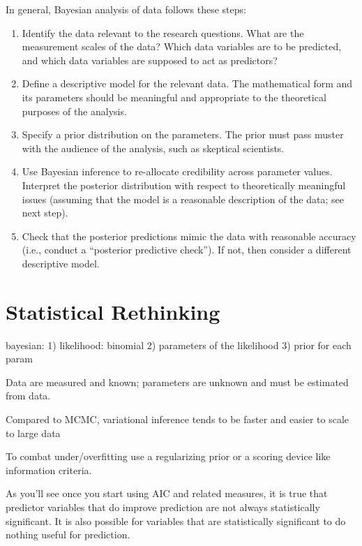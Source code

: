 \documentclass[]{book}
\begin{document}
In general, Bayesian analysis of data follows these steps:

\begin{enumerate}
\def\labelenumi{\arabic{enumi}.}
\item
  Identify the data relevant to the research questions. What are the measurement scales of the data? Which data variables are to be predicted, and which data variables are supposed to act as predictors?
\item
  Define a descriptive model for the relevant data. The mathematical form and its parameters should be meaningful and appropriate to the theoretical purposes of the analysis.
\item
  Specify a prior distribution on the parameters. The prior must pass muster with the audience of the analysis, such as skeptical scientists.
\item
  Use Bayesian inference to re-allocate credibility across parameter values. Interpret the posterior distribution with respect to theoretically meaningful issues (assuming that the model is a reasonable description of the data; see next step).
\item
  Check that the posterior predictions mimic the data with reasonable accuracy (i.e., conduct a ``posterior predictive check''). If not, then consider a different descriptive model.
\end{enumerate}

\hypertarget{statistical-rethinking}{%
\section{Statistical Rethinking}\label{statistical-rethinking}}

bayesian: 1) likelihood: binomial 2) parameters of the likelihood 3) prior for each param

Data are measured and known; parameters are unknown and must be estimated from data.

Compared to MCMC, variational inference tends to be faster and easier to scale to large data

To combat under/overfitting use a regularizing prior or a scoring device like information criteria.

As you'll see once you start using AIC and related measures, it is true that predictor variables that do improve prediction are not always statistically significant. It is also possible for variables that are statistically significant to do nothing useful for prediction.
\end{document}
